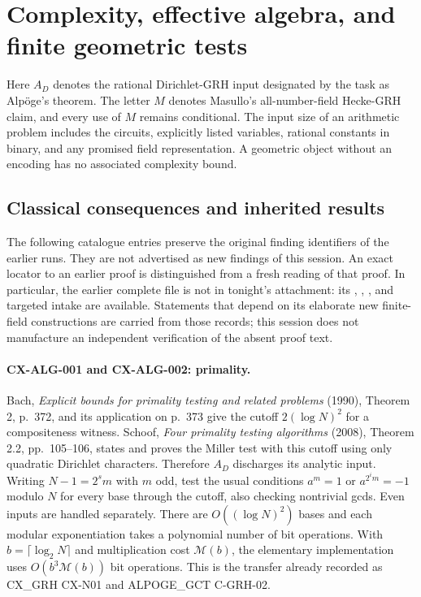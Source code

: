 \documentclass[11pt,a4paper]{article}
\begin{document}
\section{Complexity, effective algebra, and finite geometric tests}
\label{sec:complexity}

Here $A_D$ denotes the rational Dirichlet-GRH input designated by the task as
Alp\"oge's theorem. The letter $M$ denotes Masullo's all-number-field Hecke-GRH
claim, and every use of $M$ remains conditional. The input size of an arithmetic
problem includes the circuits, explicitly listed variables, rational constants
in binary, and any promised field representation. A geometric object without
an encoding has no associated complexity bound.

\subsection{Classical consequences and inherited results}

The following catalogue entries preserve the original finding identifiers of
the earlier runs. They are not advertised as new findings of this session.
An exact locator to an earlier proof is distinguished from a fresh reading of
that proof. In particular, the earlier complete file  is
not in tonight's attachment: its , ,
, and targeted intake are available. Statements that depend
on its elaborate new finite-field constructions are carried from those records;
this session does not manufacture an independent verification of the absent
proof text.

\paragraph{CX-ALG-001 and CX-ALG-002: primality.}
Bach, \emph{Explicit bounds for primality testing and related problems}
(1990), Theorem 2, p.~372, and its application on p.~373 give the cutoff
$2(\log N)^2$ for a compositeness witness. Schoof, \emph{Four primality testing
algorithms} (2008), Theorem 2.2, pp.~105--106, states and proves the Miller test
with this cutoff using only quadratic Dirichlet characters. Therefore $A_D$
discharges its analytic input. Writing $N-1=2^s m$ with $m$ odd, test the usual
conditions $a^m=1$ or $a^{2^i m}=-1$ modulo $N$ for every base through the
cutoff, also checking nontrivial gcds. Even inputs are handled separately.
There are $O((\log N)^2)$ bases and each modular exponentiation takes a
polynomial number of bit operations. With $b=\lceil\log_2N\rceil$ and
multiplication cost $\mathcal M(b)$, the elementary implementation uses
$O(b^3\mathcal M(b))$ bit operations. This is the transfer already recorded
as CX\_GRH CX-N01 and ALPOGE\_GCT C-GRH-02.
\end{document}
